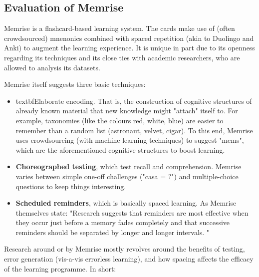 \subsection{Evaluation of Memrise}

Memrise is a flashcard-based learning system. The cards make use of (often
crowdsourced) mnenonics combined with spaced repetition (akin to Duolingo and
Anki) to augment the learning experience. It is unique in part due to its
openness regarding its techniques and its close ties with academic researchers,
who are allowed to analysis its datasets.

Memrise itself suggests three basic techniques:\cite{memrise}

\begin{itemize}

\item textbf{Elaborate encoding.} That is, the construction of cognitive structures of
  already known material that new knowledge might "attach" itself to. For
  example, taxonomies (like the colours red, white, blue) are easier to remember
  than a random list (astronaut, velvet, cigar). To this end, Memrise uses
  crowdsourcing (with machine-learning techniques) to suggest "mems", which are
  the aforementioned cognitive structures to boost learning.

\item \textbf{Choreographed testing}, which test recall and comprehension. Memrise varies
  between simple one-off challenges ("casa = ?") and multiple-choice questions
  to keep things interesting.

\item \textbf{Scheduled reminders}, which is basically spaced learning. As
  Memrise themselves state: "Research suggests that reminders are most effective
  when they occur just before a memory fades completely and that successive
  reminders should be separated by longer and longer intervals. "\cite{memrise}

\end{itemize}

Research around or by Memrise mostly revolves around the benefits of testing,
error generation (vis-a-vis errorless learning), and how spacing affects the
efficacy of the learning programme. In short:


